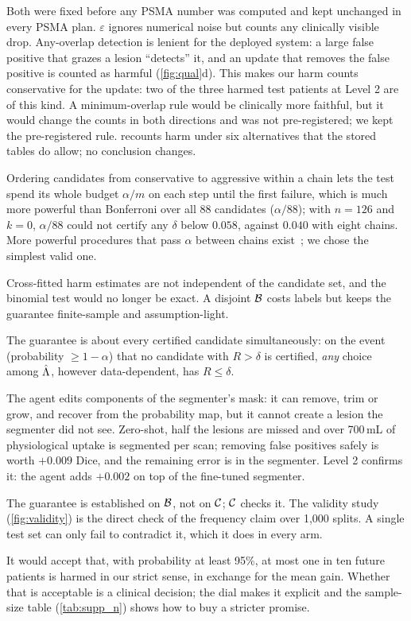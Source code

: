 Both were fixed before any PSMA number was computed and kept unchanged in every PSMA plan. $\varepsilon$ ignores numerical noise but counts any clinically visible drop. Any-overlap detection is lenient for the deployed system: a large false positive that grazes a lesion ``detects'' it, and an update that removes the false positive is counted as harmful (\cref{fig:qual}d). This makes our harm counts conservative for the update: two of the three harmed test patients at Level 2 are of this kind. A minimum-overlap rule would be clinically more faithful, but it would change the counts in both directions and was not pre-registered; we kept the pre-registered rule.  recounts harm under six alternatives that the stored tables do allow; no conclusion changes.

Ordering candidates from conservative to aggressive within a chain lets the test spend its whole budget $\alpha/m$ on each step until the first failure, which is much more powerful than Bonferroni over all 88 candidates ($\alpha/88$); with $n=126$ and $k=0$, $\alpha/88$ could not certify any $\delta$ below $0.058$, against $0.040$ with eight chains. More powerful procedures that pass $\alpha$ between chains exist~\cite{bretz2010multiple}; we chose the simplest valid one.

Cross-fitted harm estimates are not independent of the candidate set, and the binomial test would no longer be exact. A disjoint $\mathcal{B}$ costs labels but keeps the guarantee finite-sample and assumption-light.

The guarantee is about every certified candidate simultaneously: on the event (probability $\ge1-\alpha$) that no candidate with $R>\delta$ is certified, \emph{any} choice among $\hat{\Lambda}$, however data-dependent, has $R\le\delta$.

The agent edits components of the segmenter's mask: it can remove, trim or grow, and recover from the probability map, but it cannot create a lesion the segmenter did not see. Zero-shot, half the lesions are missed and over 700\,mL of physiological uptake is segmented per scan; removing false positives safely is worth $+0.009$ Dice, and the remaining error is in the segmenter. Level 2 confirms it: the agent adds $+0.002$ on top of the fine-tuned segmenter.

The guarantee is established on $\mathcal{B}$, not on $\mathcal{C}$; $\mathcal{C}$ checks it. The validity study (\cref{fig:validity}) is the direct check of the frequency claim over 1,000 splits. A single test set can only fail to contradict it, which it does in every arm.

It would accept that, with probability at least 95\%, at most one in ten future patients is harmed in our strict sense, in exchange for the mean gain. Whether that is acceptable is a clinical decision; the dial makes it explicit and the sample-size table (\cref{tab:supp_n}) shows how to buy a stricter promise.

